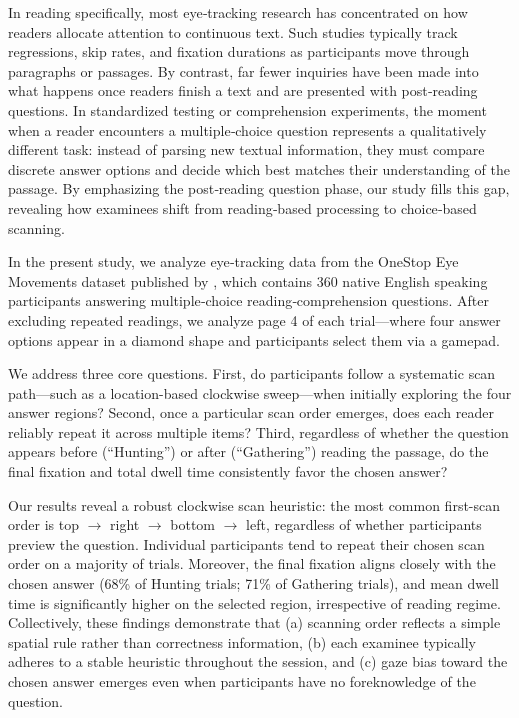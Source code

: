 \documentclass[manuscript,review,anonymous]{acmart}
\begin{document}
    In reading specifically, most eye‐tracking research has concentrated on how readers allocate attention to continuous text. Such studies typically track regressions, skip rates, and fixation durations as participants move through paragraphs or passages. By contrast, far fewer inquiries have been made into what happens once readers finish a text and are presented with post‐reading questions. In standardized testing or comprehension experiments, the moment when a reader encounters a multiple‐choice question represents a qualitatively different task: instead of parsing new textual information, they must compare discrete answer options and decide which best matches their understanding of the passage. By emphasizing the post‐reading question phase, our study fills this gap, revealing how examinees shift from reading‐based processing to choice‐based scanning. 
    
    In the present study, we analyze eye‐tracking data from the OneStop Eye Movements dataset published by \citet{berzak2025onestop}, which contains 360 native English speaking participants answering multiple‐choice reading‐comprehension questions. After excluding repeated readings, we analyze page 4 of each trial—where four answer options appear in a diamond shape and participants select them via a gamepad.

    We address three core questions. First, do participants follow a systematic scan path—such as a location-based clockwise sweep—when initially exploring the four answer regions? Second, once a particular scan order emerges, does each reader reliably repeat it across multiple items? Third, regardless of whether the question appears before (“Hunting”) or after (“Gathering”) reading the passage, do the final fixation and total dwell time consistently favor the chosen answer?

    Our results reveal a robust clockwise scan heuristic: the most common first-scan order is top $\to$ right $\to$ bottom $\to$ left, regardless of whether participants preview the question. Individual participants tend to repeat their chosen scan order on a majority of trials. Moreover, the final fixation aligns closely with the chosen answer (68\% of Hunting trials; 71\% of Gathering trials), and mean dwell time is significantly higher on the selected region, irrespective of reading regime. Collectively, these findings demonstrate that (a) scanning order reflects a simple spatial rule rather than correctness information, (b) each examinee typically adheres to a stable heuristic throughout the session, and (c) gaze bias toward the chosen answer emerges even when participants have no foreknowledge of the question.
\end{document}
